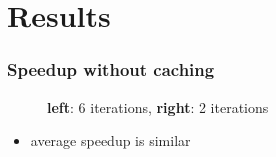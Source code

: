 \documentclass{beamer}
\begin{document}
\section{Results}
\begin{frame}
  \frametitle{Speedup without caching}
  \begin{figure}
    \centering
      \caption{\textbf{left}: 6 iterations, \textbf{right}: 2 iterations}
  \end{figure}
  
  \begin{itemize}
    \item average speedup is similar
  \end{itemize}
\end{frame}
\end{document}
